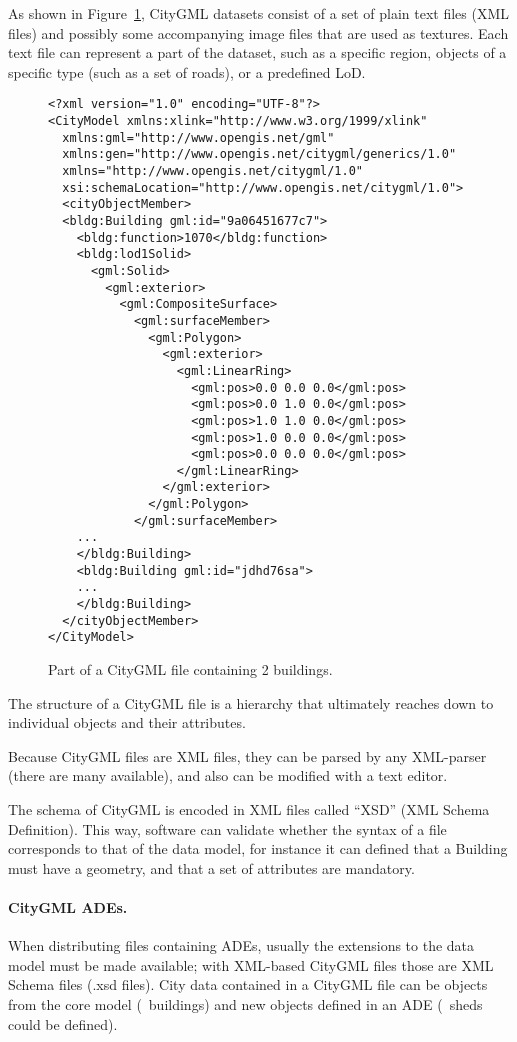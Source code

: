 As shown in Figure~\ref{fig:citygml_file}, CityGML datasets consist of a set of plain text files (XML files) and possibly some accompanying image files that are used as textures. 
Each text file can represent a part of the dataset, such as a specific region, objects of a specific type (such as a set of roads), or a predefined LoD\@.
\begin{figure}
\begin{lstlisting}
<?xml version="1.0" encoding="UTF-8"?>
<CityModel xmlns:xlink="http://www.w3.org/1999/xlink" 
  xmlns:gml="http://www.opengis.net/gml" 
  xmlns:gen="http://www.opengis.net/citygml/generics/1.0" 
  xmlns="http://www.opengis.net/citygml/1.0" 
  xsi:schemaLocation="http://www.opengis.net/citygml/1.0">
  <cityObjectMember>
  <bldg:Building gml:id="9a06451677c7">
    <bldg:function>1070</bldg:function>
    <bldg:lod1Solid>
      <gml:Solid>
        <gml:exterior>
          <gml:CompositeSurface>
            <gml:surfaceMember>
              <gml:Polygon>
                <gml:exterior>
                  <gml:LinearRing>
                    <gml:pos>0.0 0.0 0.0</gml:pos>
                    <gml:pos>0.0 1.0 0.0</gml:pos>
                    <gml:pos>1.0 1.0 0.0</gml:pos>
                    <gml:pos>1.0 0.0 0.0</gml:pos>
                    <gml:pos>0.0 0.0 0.0</gml:pos>
                  </gml:LinearRing>
                </gml:exterior>
              </gml:Polygon>
            </gml:surfaceMember>
    ...
    </bldg:Building>
    <bldg:Building gml:id="jdhd76sa">
    ...
    </bldg:Building>
  </cityObjectMember>
</CityModel>
\end{lstlisting}
\caption{Part of a CityGML file containing 2 buildings.}
\label{fig:citygml_file}
\end{figure}
The structure of a CityGML file is a hierarchy that ultimately reaches down to individual objects and their attributes. 

Because CityGML files are XML files, they can be parsed by any XML-parser (there are many available), and also can be modified with a text editor.

The schema of CityGML is encoded in XML files called ``XSD'' (XML Schema Definition).
This way, software can validate whether the syntax of a file corresponds to that of the data model, for instance it can defined that a Building must have a geometry, and that a set of attributes are mandatory.

\paragraph*{CityGML ADEs.}
When distributing files containing ADEs, usually the extensions to the data model must be made available; with XML-based CityGML files those are XML Schema files (.xsd files).
City data contained in a CityGML file can be objects from the core model (\eg\ buildings) and new objects defined in an ADE (\eg\ sheds could be defined).


